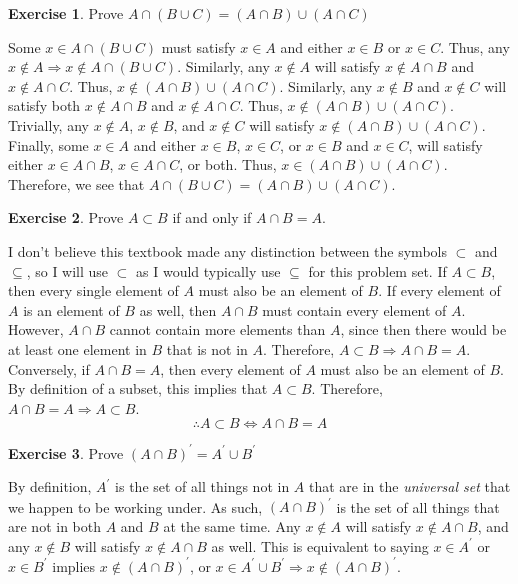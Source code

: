 \documentclass{article}
\theoremstyle{definition}
\newtheorem{environment}{Exercise}
\newenvironment{exercise}
    {\begin{mdframed}\begin{environment}}
    {\end{environment}\end{mdframed}}
\begin{document}
\begin{exercise}
    Prove \(A \cap (B\cup C)=(A\cap B)\cup (A \cap C)\)     
\end{exercise}
Some \(x\in A\cap (B\cup C)\) must satisfy \(x\in A\) and either \(x\in B\) or \(x\in C\). Thus, any \(x\notin A\Longrightarrow x\notin A\cap (B\cup C)\). Similarly, any \(x\notin A\) will satisfy \(x\notin A\cap B\) and \(x\notin A\cap C\). Thus, \(x\notin (A\cap B)\cup (A\cap C)\). Similarly, any \(x\notin B\) and \(x\notin C\) will satisfy both \(x\notin A\cap B\) and \(x\notin A\cap C\). Thus, \(x\notin (A\cap B)\cup (A\cap C)\). Trivially, any \(x\notin A\), \(x\notin B\), and \(x\notin C\) will satisfy \(x\notin (A\cap B)\cup (A\cap C)\). Finally, some \(x\in A\) and either \(x\in B\), \(x\in C\), or \(x\in B\) and \(x\in C\), will satisfy either \(x\in A\cap B\), \(x\in A\cap C\), or both. Thus, \(x\in (A\cap B)\cup (A\cap C)\). Therefore, we see that \(A\cap (B\cup C)=(A\cap B)\cup (A\cap C)\).
\begin{exercise}
    Prove \(A \subset B\) if and only if \(A\cap B=A\).
\end{exercise}
I don't believe this textbook made any distinction between the symbols \(\subset \) and \(\subseteq \), so I will use \(\subset \) as I would typically use \(\subseteq \) for this problem set. If \(A \subset B\), then every single element of \(A\) must also be an element of \(B\). If every element of \(A\) is an element of \(B\) as well, then \(A\cap B\) must contain every element of \(A\). However, \(A \cap B\) cannot contain more elements than \(A\), since then there would be at least one element in \(B\) that is not in \(A\). Therefore, \(A \subset B \Longrightarrow  A\cap B = A\).\\
Conversely, if \(A \cap B = A\), then every element of \(A\) must also be an element of \(B\). By definition of a subset, this implies that \(A \subset B\). Therefore, \(A \cap B = A \Longrightarrow A \subset B\).\\
\[
    \therefore A \subset B \iff  A\cap B=A
\]
\begin{exercise}
    Prove \((A\cap B)^{\prime} =A^{\prime} \cup B^{\prime} \) 
\end{exercise}
By definition, \(A^{\prime} \) is the set of all things not in \(A\) that are in the \emph{universal set} that we happen to be working under. As such, \((A\cap B)^{\prime} \) is the set of all things that are not in both \(A\) and \(B\) at the same time. Any \(x\notin A\) will satisfy \(x\notin A\cap B\), and any \(x\notin B\) will satisfy \(x\notin A\cap B\) as well. This is equivalent to saying \(x\in A^{\prime} \) or \(x\in B^{\prime} \) implies \(x\notin (A\cap B)^{\prime} \), or \(x\in A^{\prime} \cup B^{\prime} \Longrightarrow x\notin (A\cap B)^{\prime} \).
\end{document}
